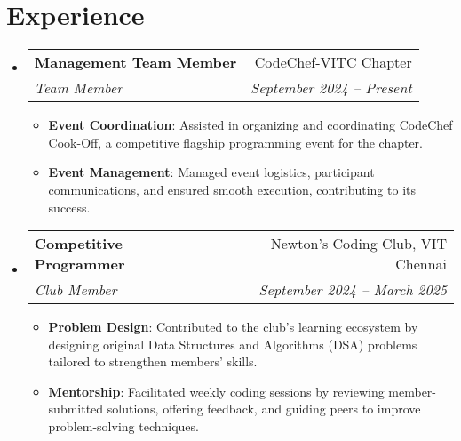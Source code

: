 \documentclass[a4paper,20pt]{article}
\makeatletter
\newcommand{\resumeItem}[2]{
  \item\small{
    \textbf{#1}{: #2 \vspace{-2pt}}
  }
}
\newcommand{\resumeSubheading}[4]{
  \vspace{-1pt}\item
    \begin{tabular*}{0.97\textwidth}{l@{\extracolsep{\fill}}r}
      \textbf{#1} & #2 \\
      \textit{#3} & \textit{#4} \\
    \end{tabular*}\vspace{-5pt}
}
\newcommand{\resumeSubHeadingListStart}{\begin{itemize}[leftmargin=*]}
\newcommand{\resumeSubHeadingListEnd}{\end{itemize}}
\newcommand{\resumeItemListStart}{\begin{itemize}}
\newcommand{\resumeItemListEnd}{\end{itemize}\vspace{-5pt}}
\makeatother
\begin{document}
\vspace{-5pt}
\section{Experience}
\resumeSubHeadingListStart

\resumeSubheading
  {Management Team Member}{CodeChef-VITC Chapter}
  {Team Member}{September 2024 – Present}
\resumeItemListStart
  \resumeItem{Event Coordination}
    {Assisted in organizing and coordinating CodeChef Cook-Off, a competitive flagship programming event for the chapter.}
  \resumeItem{Event Management}
    {Managed event logistics, participant communications, and ensured smooth execution, contributing to its success.}
\resumeItemListEnd

\resumeSubheading
  {Competitive Programmer}{Newton's Coding Club, VIT Chennai}
  {Club Member}{September 2024 – March 2025}
\resumeItemListStart
  \resumeItem{Problem Design}
    {Contributed to the club's learning ecosystem by designing original Data Structures and Algorithms (DSA) problems tailored to strengthen members' skills.}
  \resumeItem{Mentorship}
    {Facilitated weekly coding sessions by reviewing member-submitted solutions, offering feedback, and guiding peers to improve problem-solving techniques.}
\resumeItemListEnd

\resumeSubHeadingListEnd

\vspace{-5pt}
\end{document}

